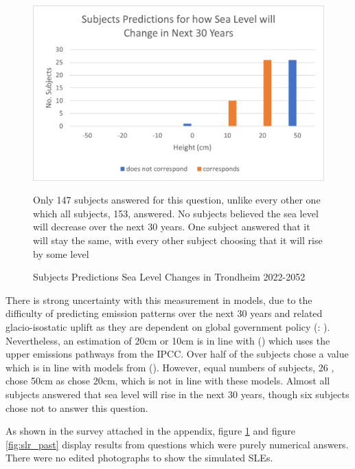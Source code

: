 \begin{figure}[H]
    \centering
    \includegraphics{fig_results/slr-future.png}
    \caption{Subjects Predictions Sea Level Changes in Trondheim 2022-2052}{Only 147 subjects answered for this question, unlike every other one which all subjects, 153, answered. No subjects believed the sea level will decrease over the next 30 years. One subject answered that it will stay the same, with every other subject choosing that it will rise by some level }
    \label{fig:slr_future}
\end{figure}

There is strong uncertainty with this measurement in models, due to the difficulty of predicting emission patterns over the next 30 years and related glacio-isostatic uplift as they are dependent on global government policy (\cite{hanssen-bauer_climate_2017}: \cite{kartverket_se_2021}). Nevertheless, an estimation of 20cm or 10cm is in line with (\cite{kartverket_se_2021}) which uses the upper emissions pathways from the IPCC. Over half of the subjects chose a value which is in line with models from (\cite{kartverket_se_2021}). However, equal numbers of subjects, 26 , chose 50cm as chose 20cm,  which is not in line with these models. Almost all subjects answered that sea level will rise in the next 30 years, though six subjects chose not to answer this question.  

As shown in the survey attached in the appendix, figure \ref{fig:slr_future} and figure \ref{fig:slr_past} display results from questions which were purely numerical answers. There were no edited photographs to show the simulated SLEs.
\paragraph{}


